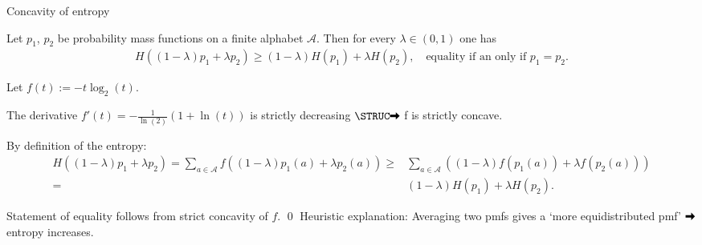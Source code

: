 \begin{frame}{Concavity of entropy}
\begin{proposition}
Let $p_1$, $p_2$ be probability mass functions on a finite alphabet $\mathcal{A}$. 
Then for every $\lambda\in(0,1)$ one has 
\begin{align*}
H((1-\lambda)p_1+\lambda p_2)\geq (1-\lambda)H(p_1)+\lambda H(p_2), \quad \text{equality if an only if $p_1=p_2$}. 
\end{align*}
\end{proposition}
\vspace{-2.9mm}
{} 
\bit 
\item Let $f(t):=-t\log_2(t)$. 
\item The derivative $f'(t)=-\frac{1}{\ln(2)}(1+\ln(t))$ is strictly decreasing $\loud\iarrow$ f is strictly concave. 
\item[\iarrow] By definition of the entropy:
\begin{align*}
H((1-\lambda)p_1+\lambda p_2)=\sum_{a\in\mathcal{A}}f((1-\lambda)p_1(a)+\lambda p_2(a))
\geq & \sum_{a\in\mathcal{A}}\left((1-\lambda)f(p_1(a))+\lambda f(p_2(a))\right)\\
=&(1-\lambda)H(p_1)+\lambda H(p_2).
\end{align*} 
 \item Statement of equality follows from strict concavity of $f$.  \qed
\eit
Heuristic explanation: Averaging two pmfs gives a `more equidistributed pmf' $\iarrow$ entropy increases. 
\end{frame}




